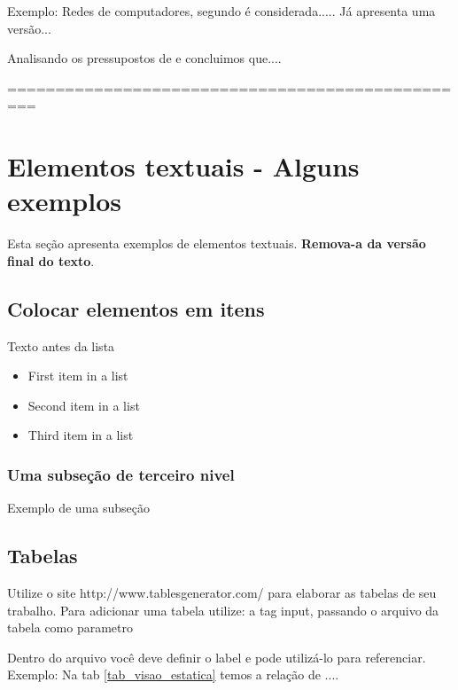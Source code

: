 \documentclass[	DIV=calc,%
							paper=a4,%
							fontsize=12pt,%
							onecolumn]{scrartcl}	 					%
\begin{document}
Exemplo: Redes de computadores, segundo \cite{t2013} é considerada..... Já \cite{kurose2010} apresenta uma versão...

Analisando os pressupostos de \cite{ref3} e \cite{ref4} concluimos que....


\renewcommand\refname{} %

  

=================================================
\section{Elementos textuais - Alguns exemplos}

Esta seção apresenta exemplos de elementos textuais. \textbf{Remova-a da versão final do texto}.


\subsection{Colocar elementos em itens}

Texto antes da lista

\begin{itemize}
	\item First item in a list 
	\item Second item in a list 
\item Third item in a list
\end{itemize}
\label{}
\subsubsection{Uma subseção de terceiro nivel}

Exemplo de uma subseção

\subsection{Tabelas}

Utilize o site http://www.tablesgenerator.com/ para elaborar as tabelas de seu trabalho.
Para adicionar uma tabela utilize: a tag input, passando o arquivo da tabela como parametro



Dentro do arquivo você deve definir o label e pode utilizá-lo para referenciar. Exemplo:
Na tab \ref{tab_visao_estatica} temos a relação de ....
\end{document}
